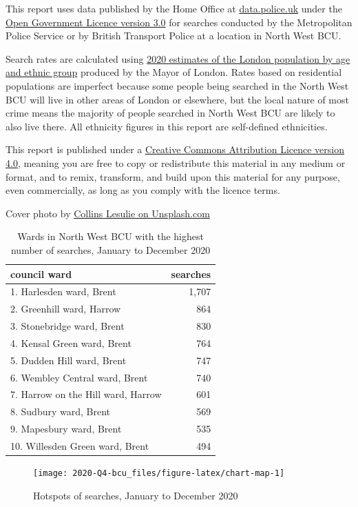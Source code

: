 \documentclass[
  a4paper,
  twoside, 11pt]{article}
\begin{document}
This report uses data published by the Home Office at \href{https://data.police.uk/}{data.police.uk} under the \href{https://www.nationalarchives.gov.uk/doc/open-government-licence/version/3/}{Open Government Licence version 3.0} for searches conducted by the Metropolitan Police Service or by British Transport Police at a location in North West BCU.

Search rates are calculated using \href{https://data.london.gov.uk/dataset/ethnic-group-population-projections}{2020 estimates of the London population by age and ethnic group} produced by the Mayor of London. Rates based on residential populations are imperfect because some people being searched in the North West BCU will live in other areas of London or elsewhere, but the local nature of most crime means the majority of people searched in North West BCU are likely to also live there. All ethnicity figures in this report are self-defined ethnicities.

This report is published under a \href{https://creativecommons.org/licenses/by/4.0/}{Creative Commons Attribution Licence version 4.0}, meaning you are free to copy or redistribute this material in any medium or format, and to remix, transform, and build upon this material for any purpose, even commercially, as long as you comply with the licence terms.

Cover photo by \href{https://unsplash.com/photos/eBJrKE3gng8}{Collins Lesulie on Unsplash.com}

\begin{table}

\caption{\label{tab:table-ward}Wards in North West BCU with the highest number of searches, January to December 2020}
\centering
\begin{tabular}[t]{lr}
\toprule
council ward & searches\\
\midrule
1. Harlesden ward, Brent & 1,707\\
2. Greenhill ward, Harrow & 864\\
3. Stonebridge ward, Brent & 830\\
4. Kensal Green ward, Brent & 764\\
5. Dudden Hill ward, Brent & 747\\
6. Wembley Central ward, Brent & 740\\
7. Harrow on the Hill ward, Harrow & 601\\
8. Sudbury ward, Brent & 569\\
9. Mapesbury ward, Brent & 535\\
10. Willesden Green ward, Brent & 494\\
\bottomrule
\end{tabular}
\end{table}




\begin{figure}[h]

{\centering \texttt{[image: 2020-Q4-bcu\_files/figure-latex/chart-map-1]} 

}

\caption{Hotspots of searches, January to December 2020}\label{fig:chart-map}
\end{figure}

\restoregeometry
\end{document}
